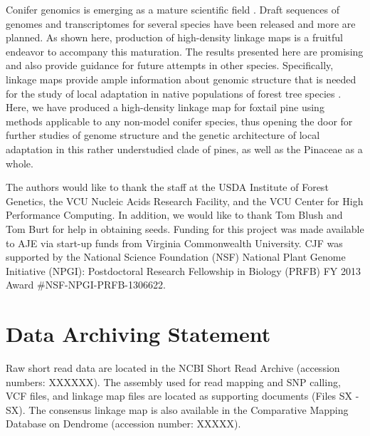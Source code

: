 \documentclass[smallextended]{svjour3}
\begin{document}
Conifer genomics is emerging as a mature scientific field
\citep{Mackay:2012}. Draft sequences of genomes and transcriptomes for several
species have been released and more are planned. As shown here, production of
high-density linkage maps is a fruitful endeavor to accompany this
maturation. The results presented here are promising and also provide guidance
for future attempts in other species.  Specifically, linkage maps provide ample
information about genomic structure that is needed for the study of local
adaptation in native populations of forest tree species
\citep[cf.,][]{Limborg:2014}. Here, we have produced a high-density
linkage map for foxtail pine using methods applicable to any non-model conifer
species, thus opening the door for further studies of genome structure and the
genetic architecture of local adaptation in this rather understudied clade of
pines, as well as the Pinaceae as a whole.

\begin{acknowledgements}
  The authors would like to thank the staff at the USDA Institute of Forest
  Genetics, the VCU Nucleic Acids Research Facility, and the VCU Center for High
  Performance Computing.  In addition, we would like to thank Tom Blush and Tom
  Burt for help in obtaining seeds. Funding for this project was made available
  to AJE via start-up funds from Virginia Commonwealth University. CJF was
  supported by the National Science Foundation (NSF) National Plant Genome
  Initiative (NPGI): Postdoctoral Research Fellowship in Biology (PRFB) FY 2013
  Award \#NSF-NPGI-PRFB-1306622.
\end{acknowledgements}


\section*{Data Archiving Statement}

Raw short read data are located in the NCBI Short Read Archive (accession
numbers: XXXXXX).  The assembly used for read mapping and SNP calling, VCF
files, and linkage map files are located as supporting documents (Files SX -
SX).  The consensus linkage map is also available in the Comparative Mapping
Database on Dendrome (accession number: XXXXX).


\clearpage





\clearpage
\end{document}
